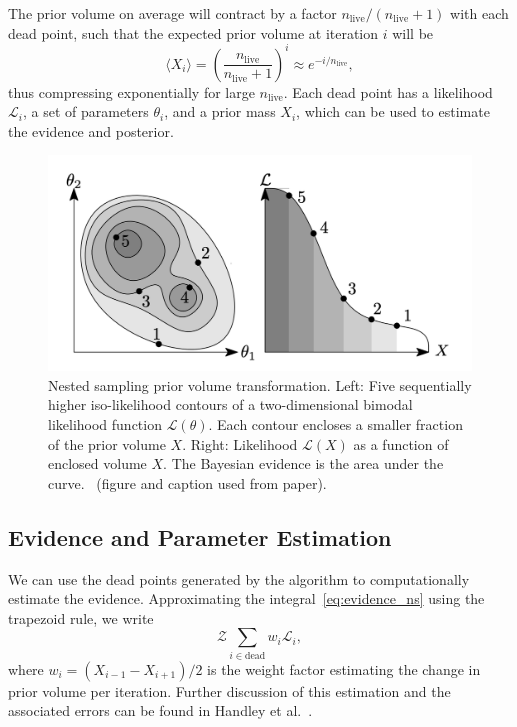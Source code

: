 \documentclass[11pt]{article}
\begin{document}
    The prior volume on average will contract by a factor $n_{\text{live}}/(n_{\text{live}}+1)$ with each dead point, such that the
    expected prior volume at iteration $i$ will be
    \begin{equation}\label{eq:exp_prior_volume}
        \langle X_i \rangle = \left( \frac{n_{\text{live}}}{n_{\text{live}} + 1} \right)^i \approx e^{-i/n_{\text{live}}},
    \end{equation}
    thus compressing exponentially for large $n_{\text{live}}$.
    Each dead point has a likelihood $\mathcal{L}_i$, a set of parameters $\theta_i$, and a prior mass $X_i$, which can
    be used to estimate the evidence and posterior.

    \begin{figure}[t!]
        \center
        \includegraphics[width=\linewidth]{../figures/NestedSamplingPolychord}
        \caption{
            Nested sampling prior volume transformation. Left: Five sequentially higher iso-likelihood contours of a
            two-dimensional bimodal likelihood function $\mathcal{L}(\theta)$. Each contour encloses a smaller fraction
            of the prior volume $X$. Right: Likelihood $\mathcal{L}(X)$ as a function of enclosed volume $X$. The
            Bayesian evidence is the area under the curve.~\cite{Handley_polychord, Handley_2015}
            (figure and caption used from paper).
        }\label{fig:nested_sampling}
    \end{figure}


\subsection{Evidence and Parameter Estimation}\label{subsec:evidence_param_estimation}
    We can use the dead points generated by the algorithm to computationally estimate the evidence.
    Approximating the integral~\ref{eq:evidence_ns} using the trapezoid rule, we write
    \begin{equation}\label{eq:evidence_estimation}
        \mathcal{Z} \sum_{i \in \text{dead}} w_i \mathcal{L}_i,
    \end{equation}
    where $w_i = (X_{i-1} - X_{i+1})/2$ is the weight factor estimating the change in prior volume per iteration.
    Further discussion of this estimation and the associated errors can be found in
    Handley et al.~\cite{Handley_2015, NS_Review_2022}.
\end{document}
